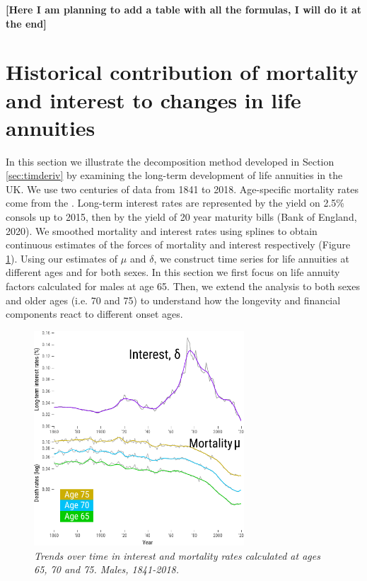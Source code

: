 \documentclass[12pt]{article}
\begin{document}
\textbf{[Here I am planning to add a table with all the formulas, I will do it at the end]}

\section{Historical contribution of mortality and interest to changes in life annuities}



In this section we illustrate the decomposition method developed in Section \ref{sec:timderiv} by examining the long-term development of life annuities in the UK. We use two centuries of data from 1841 to 2018. Age-specific mortality rates come from the \citep{HMD2020}. Long-term interest rates are represented by the yield on 2.5\% consols up to 2015, then by the yield of 20 year maturity bills (Bank of England, 2020). We smoothed mortality and interest rates using splines \citep{green1993nonparametric,camarda2012mortalitysmooth} to obtain continuous estimates of the forces of mortality and interest respectively (Figure \ref{fig:Fig1}). Using our estimates of $\mu$ and $\delta$, we construct time series for life annuities at different ages and for both sexes. In this section we first focus on life annuity factors calculated for males at age 65. Then, we extend the analysis to both sexes and older ages (i.e. 70 and 75) to understand how the longevity and financial components react to different onset ages.

\begin{figure}[!ht]
	\centering
	\includegraphics[width=0.7\textwidth]{Fig/Fig1}
	\caption{\textit{Trends over time in interest and mortality rates calculated at ages 65, 70 and 75. Males, 1841-2018.}}
	\label{fig:Fig1}
\end{figure}
\end{document}
